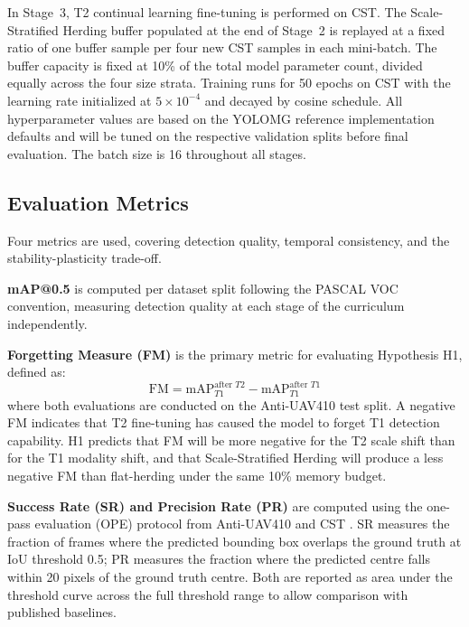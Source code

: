In Stage~3, T2 continual learning fine-tuning is performed on CST. The Scale-Stratified Herding buffer populated at the end of Stage~2 is replayed at a fixed ratio of one buffer sample per four new CST samples in each mini-batch. The buffer capacity is fixed at 10\% of the total model parameter count, divided equally across the four size strata. Training runs for 50 epochs on CST with the learning rate initialized at $5 \times 10^{-4}$ and decayed by cosine schedule. All hyperparameter values are based on the YOLOMG reference implementation defaults \cite{guo_yolomg_2025} and will be tuned on the respective validation splits before final evaluation. The batch size is 16 throughout all stages.

\subsection{Evaluation Metrics}
\label{sec:metrics}

Four metrics are used, covering detection quality, temporal consistency, and the stability-plasticity trade-off.

\textbf{mAP@0.5} is computed per dataset split following the PASCAL VOC convention, measuring detection quality at each stage of the curriculum independently.

\textbf{Forgetting Measure (FM)} is the primary metric for evaluating Hypothesis H1, defined as:
\begin{equation}
    \text{FM} = \text{mAP}_{T1}^{\text{after } T2} - \text{mAP}_{T1}^{\text{after } T1}
    \label{eq:fm}
\end{equation}
where both evaluations are conducted on the Anti-UAV410 test split. A negative FM indicates that T2 fine-tuning has caused the model to forget T1 detection capability. H1 predicts that FM will be more negative for the T2 scale shift than for the T1 modality shift, and that Scale-Stratified Herding will produce a less negative FM than flat-herding under the same 10\% memory budget.

\textbf{Success Rate (SR) and Precision Rate (PR)} are computed using the one-pass evaluation (OPE) protocol from Anti-UAV410 \cite{bohuang_410} and CST \cite{xie2025cstantiuavthermalinfrared}. SR measures the fraction of frames where the predicted bounding box overlaps the ground truth at IoU threshold 0.5; PR measures the fraction where the predicted centre falls within 20 pixels of the ground truth centre. Both are reported as area under the threshold curve across the full threshold range to allow comparison with published baselines.

